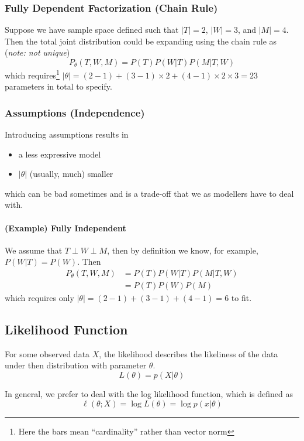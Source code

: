 \documentclass[11pt]{article}
\newcommand{\independent}{\perp}
\begin{document}
\subsubsection{Fully Dependent Factorization (Chain Rule)}
Suppose we have sample space defined such that $|T| = 2$, $|W| = 3$, and $|M| = 4$. Then the total joint distribution could be expanding using the chain rule as (\textit{note: not unique})
\begin{equation*}
    P_\theta(T,W,M) = P(T)P(W|T)P(M|T,W)
\end{equation*} 
which requires\footnote{Here the bars mean ``cardinality'' rather than vector norm} $|\theta| = (2 - 1) + (3 - 1) \times 2 + (4 - 1)\times 2 \times 3 = 23$ parameters in total to specify. 

\subsubsection{Assumptions (Independence)}
Introducing assumptions results in
\begin{itemize}
    \item a less expressive model
    \item $|\theta|$ (usually, much) smaller
\end{itemize}
which can be bad sometimes and is a trade-off that we as modellers have to deal with. 

\paragraph{(Example) Fully Independent}
We assume that $T\independent W \independent M$, then by definition we know, for example, $P(W|T)= P(W)$. Then
\begin{align*}
    P_\theta(T,W,M) &= P(T)P(W|T)P(M|T,W) \\
    &= P(T)P(W)P(M)
\end{align*}
which requires only $|\theta| = (2-1) + (3-1) + (4-1) = 6$ to fit.

\subsection{Likelihood Function}
For some observed data $X$, the likelihood describes the likeliness of the data under then distribution with parameter $\theta$. 
\begin{equation*}
    L(\theta) = p(X|\theta)
\end{equation*}

In general, we prefer to deal with the log likelihood function, which is defined as
\begin{equation*}
    \ell(\theta;X) = \log L(\theta) = \log p(x|\theta)
\end{equation*}
\end{document}
